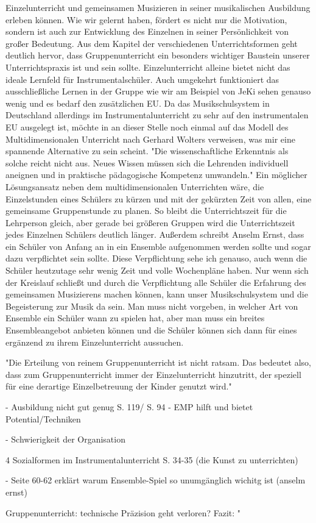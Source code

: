 Einzelunterricht und gemeinsamen Musizieren in seiner musikalischen Ausbildung
erleben können. Wie wir gelernt haben, fördert es nicht nur die Motivation,
sondern ist auch zur Entwicklung des Einzelnen in seiner Persönlichkeit von
großer Bedeutung. 
Aus dem Kapitel der verschiedenen Unterrichtsformen geht deutlich hervor, dass
Gruppenunterricht ein besonders wichtiger Baustein unserer Unterrichtspraxis
ist und sein sollte. Einzelunterricht alleine bietet nicht das ideale Lernfeld
für Instrumentalschüler. Auch umgekehrt funktioniert das ausschließliche Lernen
in der Gruppe wie wir am Beispiel von JeKi sehen genauso wenig und es bedarf den
zusätzlichen EU. Da das Musikschulsystem in Deutschland allerdings im
Instrumentalunterricht zu sehr auf den instrumentalen EU ausgelegt ist, möchte
in an dieser Stelle noch einmal auf das Modell des Multidimensionalen Unterricht
nach Gerhard Wolters verweisen, was mir eine spannende Alternative zu sein
scheint. %
"Die wissenschaftliche Erkenntnis als solche reicht nicht aus. Neues Wissen
müssen sich die Lehrenden individuell aneignen und in praktische pädagogische
Kompetenz umwandeln." \autocite[10]{losert:die_kunst_zu_unterrichten} Ein
möglicher Lösungsansatz neben dem multidimensionalen Unterrichten wäre, die
Einzelstunden eines Schülers zu kürzen und mit der gekürzten Zeit von allen, eine
gemeinsame Gruppenstunde zu planen. So bleibt die Unterrichtszeit für die
Lehrperson gleich, aber gerade bei größeren Gruppen wird die Unterrichtszeit
jedes Einzelnen Schülers deutlich länger.\autocite[33]{losert:die_kunst_zu_unterrichten}
Außerdem schreibt Anselm Ernst, dass ein Schüler von Anfang an in ein Ensemble
aufgenommen werden sollte und sogar dazu verpflichtet sein sollte. \autocite[61]{ernst:die_zukunftsfaehige_musikschule}
Diese Verpflichtung sehe ich genauso, auch wenn die Schüler heutzutage sehr
wenig Zeit und volle Wochenpläne haben. Nur wenn sich der Kreislauf schließt und
durch die Verpflichtung alle Schüler die Erfahrung des gemeinsamen
Musizierens machen können, kann unser Musikschulsystem und die Begeisterung zur
Musik da sein. Man muss nicht vorgeben, in welcher Art von Ensemble ein Schüler
wann zu spielen hat, aber man muss ein breites Ensembleangebot anbieten können
und die Schüler können sich dann für eines ergänzend zu ihrem Einzelunterricht aussuchen.

"Die  Erteilung von reinem Gruppenunterricht ist nicht ratsam. Das
bedeutet also, dass zum Gruppenunterricht immer der Einzelunterricht hinzutritt,
der speziell für eine derartige Einzelbetreuung der Kinder genutzt wird."
\autocite[57]{ernst:die_zukunftsfaehige_musikschule}






- Ausbildung nicht gut genug S. 119/ S. 94
- EMP hilft und bietet Potential/Techniken

- Schwierigkeit der Organisation


4 Sozialformen im Instrumentalunterricht S. 34-35    (die Kunst zu unterrichten)

- Seite 60-62 erklärt warum Ensemble-Spiel so unumgänglich wichitg ist (anselm
ernst)

Gruppenunterricht: technische Präzision geht verloren? 
Fazit: "
